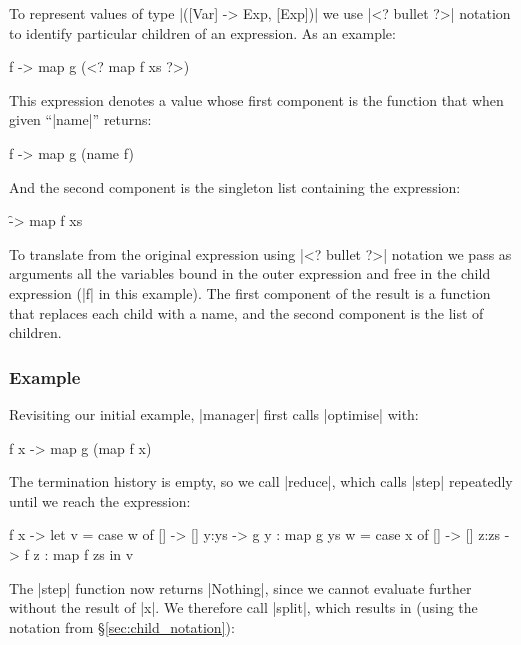 \documentclass[draft]{sigplanconf}
\begin{document}
To represent values of type |([Var] -> Exp, [Exp])| we use |<? bullet ?>| notation to identify particular children of an expression. As an example:

\begin{code}
\g f -> map g (<? map f xs ?>)
\end{code}

\noindent This expression denotes a value whose first component is the function that when given ``|name|'' returns:

\begin{code}
\g f -> map g (name f)
\end{code}

\noindent And the second component is the singleton list containing the expression:

\begin{code}
\f -> map f xs
\end{code}

To translate from the original expression using |<? bullet ?>| notation we pass as arguments all the variables bound in the outer expression and free in the child expression (|f| in this example). The first component of the result is a function that replaces each child with a name, and the second component is the list of children.

\subsubsection{Example}
\label{sec:manager_example}

Revisiting our initial example, |manager| first calls |optimise| with:

\begin{code}
\g f x -> map g (map f x)
\end{code}

The termination history is empty, so we call |reduce|, which calls |step| repeatedly until we reach the expression:

\begin{code}
\g f x ->  let  v = case  w of
                          []    -> []
                          y:ys  -> g y : map g ys
                w = case  x of
                          []    -> []
                          z:zs  -> f z : map f zs
           in   v
\end{code}

The |step| function now returns |Nothing|, since we cannot evaluate further without the result of |x|. We therefore call |split|, which results in (using the notation from \S\ref{sec:child_notation}):
\end{document}

